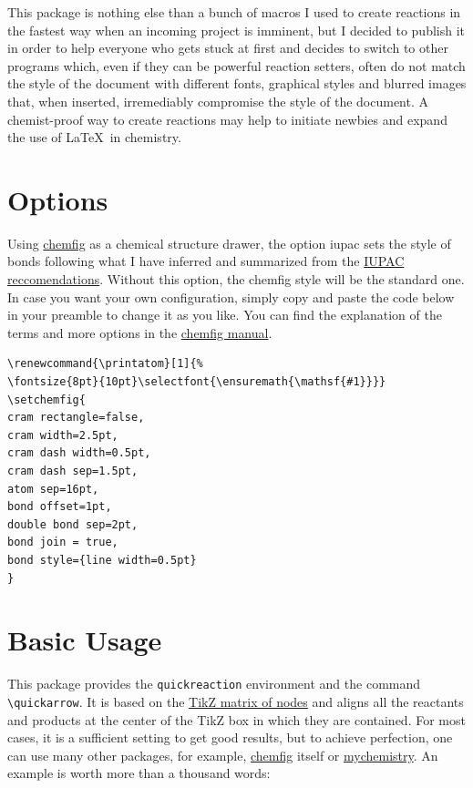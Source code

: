 \documentclass{scrarticle}
\begin{document}
This package is nothing else than a bunch of macros I used to create reactions in the fastest way when an incoming project is imminent, but I decided to publish it in order to help everyone who gets stuck at first and decides to switch to other programs which, even if they can be powerful reaction setters, often do not match the style of the document with different fonts, graphical styles and blurred images that, when inserted, irremediably compromise the style of the document. A chemist-proof way to create reactions may help to initiate newbies and expand the use of \LaTeX \ in chemistry.

\section{Options}

Using \href{https://www.ctan.org/pkg/chemfig}{\ttfamily chemfig} as a chemical structure drawer, the option {\ttfamily iupac} sets the style of bonds following what I have inferred and summarized from the \href{https://iupac.qmul.ac.uk/drawing/drawing.html}{\ttfamily IUPAC reccomendations}. Without this option, the chemfig style will be the standard one. In case you want your own configuration, simply copy and paste the code below in your preamble to change it as you like. You can find the explanation of the terms and more options in the \href{https://ctan.mirror.garr.it/mirrors/ctan/macros/generic/chemfig/chemfig-en.pdf}{\ttfamily chemfig manual}.

\begin{lstlisting}
\renewcommand{\printatom}[1]{%
\fontsize{8pt}{10pt}\selectfont{\ensuremath{\mathsf{#1}}}}
\setchemfig{
cram rectangle=false,
cram width=2.5pt,
cram dash width=0.5pt,
cram dash sep=1.5pt,
atom sep=16pt,
bond offset=1pt,
double bond sep=2pt,
bond join = true,
bond style={line width=0.5pt}
}
\end{lstlisting}

\section{Basic Usage}
This package provides the \lstinline{quickreaction} environment and the command \lstinline{\quickarrow}. It is based on the \href{https://tikz.dev/tikz-matrices}{\ttfamily TikZ matrix of nodes} and aligns all the reactants and products at the center of the TikZ box in which they are contained. For most cases, it is a sufficient setting to get good results, but to achieve perfection, one can use many other packages, for example, \href{https://www.ctan.org/pkg/chemfig}{\ttfamily chemfig} itself or \href{https://www.ctan.org/pkg/mychemistry}{\ttfamily mychemistry}. An example is worth more than a thousand words:
\end{document}
